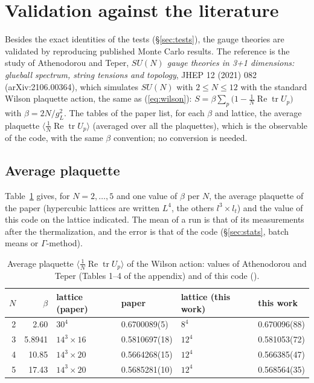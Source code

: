 \documentclass[11pt]{article}
\newcommand{\code}[1]{\texttt{\detokenize{#1}}}
\newcommand{\tr}{\operatorname{tr}}
\renewcommand{\Re}{\operatorname{Re}}
\begin{document}
\section{Validation against the literature}
\label{sec:validation}

Besides the exact identities of the tests (\S\ref{sec:tests}), the gauge theories are validated by reproducing published Monte Carlo results. The reference is the
study of Athenodorou and Teper, \emph{$SU(N)$ gauge theories in 3+1 dimensions: glueball spectrum, string tensions and topology}, JHEP 12 (2021) 082
\cite{AT21} (arXiv:2106.00364), which simulates $SU(N)$ with $2\le N\le12$ with the standard Wilson plaquette action, the same as (\ref{eq:wilson}):
$S=\beta\sum_p\big(1-\tfrac1N\Re\tr U_p\big)$ with $\beta=2N/g^2_L$. The tables of the paper list, for each $\beta$ and lattice, the average plaquette
$\langle\tfrac1N\Re\tr U_p\rangle$ (averaged over all the plaquettes), which is the observable \code{plaq_re} of the code, with the same $\beta$ convention; no conversion is needed.

\subsection{Average plaquette}
Table~\ref{tab:plaq} gives, for $N=2,\dots,5$ and one value of $\beta$ per $N$, the average plaquette of the paper (hypercubic lattices are written $L^4$, the others
$l^3\times l_t$) and the value of this code on the lattice indicated. The mean of a run is that of its measurements after the thermalization, and the error is
that of the code (\S\ref{sec:stats}, batch means or $\Gamma$-method).

\begin{table}[h]
\centering
\begin{tabular}{@{}rrllll@{}}
\toprule
$N$ & $\beta$ & lattice (paper) & paper \cite{AT21} & lattice (this work) & this work \\
\midrule
2 & 2.60   & $30^4$         & 0.6700089(5)  & $8^4$  & 0.670096(88) \\
3 & 5.8941 & $14^3\times16$ & 0.5810697(18) & $12^4$ & 0.581053(72) \\
4 & 10.85  & $14^3\times20$ & 0.5664268(15) & $12^4$ & 0.566385(47) \\
5 & 17.43  & $14^3\times20$ & 0.5685281(10) & $12^4$ & 0.568564(35) \\
\bottomrule
\end{tabular}
\caption{Average plaquette $\langle\frac1N\Re\tr U_p\rangle$ of the Wilson action: values of Athenodorou and Teper \cite{AT21} (Tables 1--4 of the appendix) and of
this code (\code{plaq_re}).}\label{tab:plaq}
\end{table}
\end{document}
